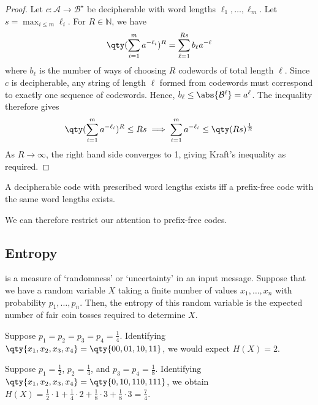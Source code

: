 \begin{proof}
    Let $c \colon \mathcal A \to \mathcal B^\star$ be decipherable with word lengths $\ell_1, \dots, \ell_m$.
    Let $s = \max_{i \leq m} \ell_i$.
    For $R \in \mathbb N$, we have
    \begin{align*}
        \qty(\sum_{i=1}^m a^{-\ell_i})^R = \sum_{\ell = 1}^{Rs} b_\ell a^{-\ell}
    \end{align*}
    where $b_\ell$ is the number of ways of choosing $R$ codewords of total length $\ell$.
    Since $c$ is decipherable, any string of length $\ell$ formed from codewords must correspond to exactly one sequence of codewords.
    Hence, $b_\ell \leq \abs{\mathcal B^\ell} = a^\ell$.
    The inequality therefore gives
    \begin{align*}
        \qty(\sum_{i=1}^m a^{-\ell_i})^R \leq Rs \implies \sum_{i=1}^m a^{-\ell_i} \leq \qty(Rs)^{\frac{1}{R}}
    \end{align*}
    As $R \to \infty$, the right hand side converges to 1, giving Kraft's inequality as required.
\end{proof}

\begin{corollary}
    A decipherable code with prescribed word lengths exists iff a prefix-free code with the same word lengths exists.
\end{corollary}
We can therefore restrict our attention to prefix-free codes.

\subsection{Entropy}
 is a measure of `randomness' or `uncertainty' in an input message.
Suppose that we have a random variable $X$ taking a finite number of values $x_1, \dots, x_n$ with probability $p_1, \dots, p_n$.
Then, the entropy of this random variable is the expected number of fair coin tosses required to determine $X$.

\begin{example}
    Suppose $p_1 = p_2 = p_3 = p_4 = \frac{1}{4}$.
    Identifying $\qty{x_1, x_2, x_3, x_4} = \qty{00, 01, 10, 11}$, we would expect $H(X) = 2$.
\end{example}

\begin{example}
    Suppose $p_1 = \frac{1}{2}$, $p_2 = \frac{1}{4}$, and $p_3 = p_4 = \frac{1}{8}$.
    Identifying $\qty{x_1, x_2, x_3, x_4} = \qty{0, 10, 110, 111}$, we obtain $H(X) = \frac{1}{2} \cdot 1 + \frac{1}{4} \cdot 2 + \frac{1}{8} \cdot 3 + \frac{1}{8} \cdot 3 = \frac{7}{4}$.
\end{example}

